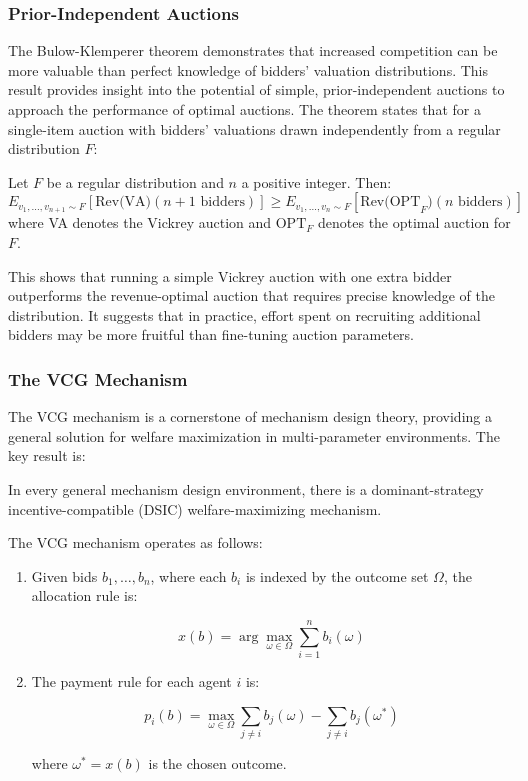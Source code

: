 \documentclass[
  letterpaper,
  numbers=noenddot,
  DIV=11,
  oneside]{scrreprt}
\theoremstyle{remark}
\begin{document}
\subsubsection*{Prior-Independent
Auctions}\label{prior-independent-auctions}

The Bulow-Klemperer theorem demonstrates that increased competition can
be more valuable than perfect knowledge of bidders' valuation
distributions. This result provides insight into the potential of
simple, prior-independent auctions to approach the performance of
optimal auctions. The theorem states that for a single-item auction with
bidders' valuations drawn independently from a regular distribution
\(F\):

Let \(F\) be a regular distribution and \(n\) a positive integer. Then:
\[E_{v_1,\ldots,v_{n+1} \sim F}[\text{Rev(VA)}(n+1 \text{ bidders})] \geq E_{v_1,\ldots,v_n \sim F}[\text{Rev(OPT}_F)(n \text{ bidders})]\]
where VA denotes the Vickrey auction and \(\text{OPT}_F\) denotes the
optimal auction for \(F\).

This shows that running a simple Vickrey auction with one extra bidder
outperforms the revenue-optimal auction that requires precise knowledge
of the distribution. It suggests that in practice, effort spent on
recruiting additional bidders may be more fruitful than fine-tuning
auction parameters.

\subsubsection*{The VCG Mechanism}\label{the-vcg-mechanism}

The VCG mechanism is a cornerstone of mechanism design theory, providing
a general solution for welfare maximization in multi-parameter
environments. The key result is:

\label{thm:VCG}{} In every general mechanism design
environment, there is a dominant-strategy incentive-compatible (DSIC)
welfare-maximizing mechanism.

The VCG mechanism operates as follows:

\begin{enumerate}
\def\labelenumi{\arabic{enumi}.}
\item
  Given bids \(b_1, \ldots, b_n\), where each \(b_i\) is indexed by the
  outcome set \(\Omega\), the allocation rule is:

  \[x(b) = \arg \max_{\omega \in \Omega} \sum_{i=1}^n b_i(\omega)\]
\item
  The payment rule for each agent \(i\) is:

  \[p_i(b) = \max_{\omega \in \Omega} \sum_{j \neq i} b_j(\omega) - \sum_{j \neq i} b_j(\omega^*)\]

  where \(\omega^* = x(b)\) is the chosen outcome.
\end{enumerate}
\end{document}
